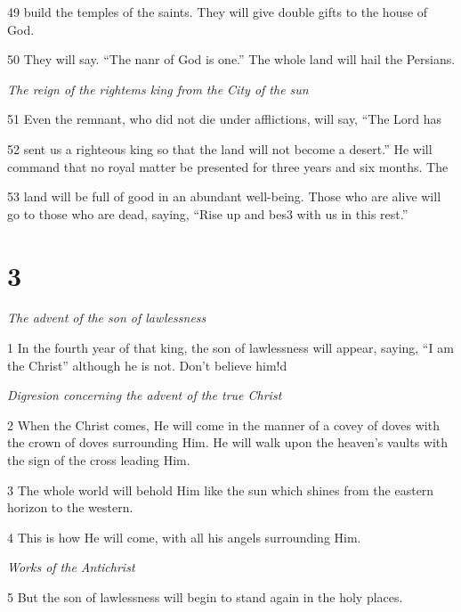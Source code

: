 \par 49 build the temples of the saints. They will give double gifts to the house of God. 

\par 50 They will say. “The nanr of God is one.” The whole land will hail the Persians.

\par \textit{The reign of the rightems king from the City of the sun}

\par 51 Even the remnant, who did not die under afflictions, will say, “The Lord has

\par 52 sent us a righteous king so that the land will not become a desert.” He will command that no royal matter be presented for three years and six months. The

\par 53 land will be full of good in an abundant well-being. Those who are alive will go to those who are dead, saying, “Rise up and bes3 with us in this rest.”

\chapter{3}

\par \textit{The advent of the son of lawlessness}

\par 1 In the fourth year of that king, the son of lawlessness will appear, saying, “I am the Christ” although he is not. Don't believe him!d

\par \textit{Digresion concerning the advent of the true Christ}

\par 2 When the Christ comes, He will come in the manner of a covey of doves with the crown of doves surrounding Him. He will walk upon the heaven's vaults with the sign of the cross leading Him. 

\par 3 The whole world will behold Him like the sun which shines from the eastern horizon to the western.

\par 4 This is how He will come, with all his angels surrounding Him.


\par \textit{Works of the Antichrist}

\par 5 But the son of lawlessness will begin to stand again in the holy places.

